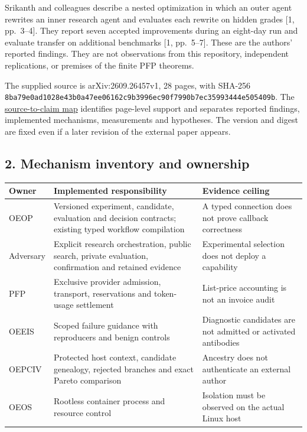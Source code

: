 \documentclass[
  11pt,
]{article}
\begin{document}
Srikanth and colleagues describe a nested optimization in which an outer
agent rewrites an inner research agent and evaluates each rewrite on
hidden grades {[}1, pp.~3--4{]}. They report seven accepted improvements
during an eight-day run and evaluate transfer on additional benchmarks
{[}1, pp.~5--7{]}. These are the authors' reported findings. They are
not observations from this repository, independent replications, or
premises of the finite PFP theorems.

The supplied source is arXiv:2609.26457v1, 28 pages, with SHA-256
\nolinkurl{8ba79e0ad1028e43b0a47ee06162c9b3996ec90f7990b7ec35993444e505409b}.
The \href{docs/source_to_claim_map.md}{source-to-claim map} identifies
page-level support and separates reported findings, implemented
mechanisms, measurements and hypotheses. The version and digest are
fixed even if a later revision of the external paper appears.

\subsection{2. Mechanism inventory and
ownership}\label{mechanism-inventory-and-ownership}

\begin{longtable}[]{@{}
  >{\raggedright\arraybackslash}p{}
  >{\raggedright\arraybackslash}p{}
  >{\raggedright\arraybackslash}p{}@{}}
\toprule\noalign{}
\begin{minipage}[b]{\linewidth}\raggedright
Owner
\end{minipage} & \begin{minipage}[b]{\linewidth}\raggedright
Implemented responsibility
\end{minipage} & \begin{minipage}[b]{\linewidth}\raggedright
Evidence ceiling
\end{minipage} \\
\midrule\noalign{}
\endhead
\bottomrule\noalign{}
\endlastfoot
OEOP & Versioned experiment, candidate, evaluation and decision
contracts; existing typed workflow compilation & A typed connection does
not prove callback correctness \\
Adversary & Explicit research orchestration, public search, private
evaluation, confirmation and retained evidence & Experimental selection
does not deploy a capability \\
PFP & Exclusive provider admission, transport, reservations and
token-usage settlement & List-price accounting is not an invoice
audit \\
OEEIS & Scoped failure guidance with reproducers and benign controls &
Diagnostic candidates are not admitted or activated antibodies \\
OEPCIV & Protected host context, candidate genealogy, rejected branches
and exact Pareto comparison & Ancestry does not authenticate an external
author \\
OEOS & Rootless container process and resource control & Isolation must
be observed on the actual Linux host \\
\end{longtable}
\end{document}
